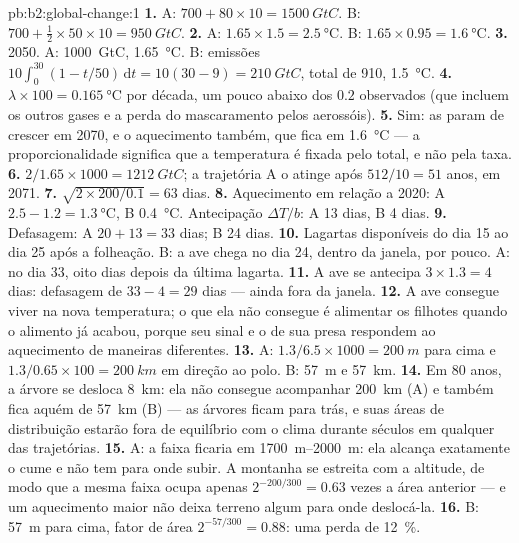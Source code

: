 \begin{solution}{pb:b2:global-change:1}
\textbf{1.} A: $700 + 80\times 10 = \qty{1500}{GtC}$. B: $700 +
\tfrac12\times 50\times 10 = \qty{950}{GtC}$.
\textbf{2.} A: $1.65\times 1.5 = \qty{2.5}{\celsius}$. B:
$1.65\times 0.95 = \qty{1.6}{\celsius}$.
\textbf{3.} 2050. A: \qty{1000}{GtC}, \qty{1.65}{\celsius}. B:
emissões $10\int_0^{30}(1 - t/50)\,\mathrm{d}t = 10(30 - 9) =
\qty{210}{GtC}$, total de 910, \qty{1.5}{\celsius}.
\textbf{4.} $\lambda\times 100 = \qty{0.165}{\celsius}$ por década,
um pouco abaixo dos $0.2$ observados (que incluem os outros gases e a
perda do mascaramento pelos aerossóis).
\textbf{5.} Sim: as  param de crescer em 2070, e o
aquecimento também, que fica em \qty{1.6}{\celsius} --- a
proporcionalidade significa que a temperatura é fixada pelo total, e não
pela taxa.
\textbf{6.} $2/1.65\times 1000 = \qty{1212}{GtC}$; a trajetória A o
atinge após $512/10 = 51$ anos, em 2071.
\textbf{7.} $\sqrt{2\times 200/0.1} = 63$ dias.
\textbf{8.} Aquecimento em relação a 2020: A $2.5 - 1.2 =
\qty{1.3}{\celsius}$, B \qty{0.4}{\celsius}. Antecipação $\Delta T/b$:
A 13 dias, B 4 dias.
\textbf{9.} Defasagem: A $20 + 13 = 33$ dias; B 24 dias.
\textbf{10.} Lagartas disponíveis do dia 15 ao dia 25 após a folheação.
B: a ave chega no dia 24, dentro da janela, por pouco. A: no dia 33,
oito dias depois da última lagarta.
\textbf{11.} A ave se antecipa $3\times 1.3 = 4$ dias: defasagem de $33 - 4 =
29$ dias --- ainda fora da janela.
\textbf{12.} A ave consegue viver na nova temperatura; o que ela não
consegue é alimentar os filhotes quando o alimento já acabou, porque seu
sinal e o de sua presa respondem ao aquecimento de maneiras diferentes.
\textbf{13.} A: $1.3/6.5\times 1000 = \qty{200}{m}$ para cima e
$1.3/0.65\times 100 = \qty{200}{km}$ em direção ao polo. B: \qty{57}{m} e
\qty{57}{km}.
\textbf{14.} Em 80 anos, a árvore se desloca \qty{8}{km}: ela não
consegue acompanhar \qty{200}{km} (A) e também fica aquém de \qty{57}{km}
(B) --- as árvores ficam para trás, e suas áreas de distribuição estarão
fora de equilíbrio com o clima durante séculos em qualquer das
trajetórias.
\textbf{15.} A: a faixa ficaria em \qtyrange{1700}{2000}{m}: ela alcança
exatamente o cume e não tem para onde subir. A montanha se estreita com a
altitude, de modo que a mesma faixa ocupa apenas $2^{-200/300} = 0.63$ vezes
a área anterior --- e um aquecimento maior não deixa terreno algum para
onde deslocá-la.
\textbf{16.} B: \qty{57}{m} para cima, fator de área $2^{-57/300} = 0.88$:
uma perda de \qty{12}{\%}.

\end{solution}
